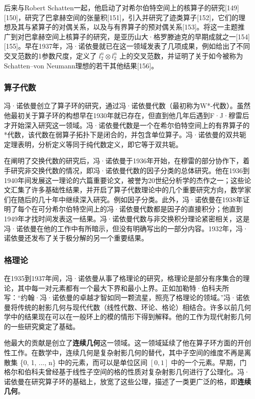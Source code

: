 后来与Robert Schatten一起，他启动了对希尔伯特空间上的核算子的研究[149][150]，研究了巴拿赫空间的张量积[151]，引入并研究了迹类算子[152]，它们的理想及其与紧算子的对偶关系，以及与有界算子的预对偶关系[153]。将这一主题推广到对巴拿赫空间上核算子的研究，是亚历山大·格罗滕迪克的早期成就之一[154][155]。早在1937年，冯·诺依曼就已在这一领域发表了几项成果，例如给出了不同交叉范数的1参数尺度，定义了 \({\textit {l}}_{2}^{n} \otimes {\textit {l}}_{2}^{n}\)  上的交叉范数，并证明了关于如今被称为Schatten–von Neumann理想的若干其他结果[156]。
\subsubsection{算子代数}
冯·诺依曼创立了算子环的研究，通过冯·诺依曼代数（最初称为W*-代数）。虽然他最初关于算子环的构想早在1930年就已存在，但直到他几年后遇到F·J·穆雷后才开始深入研究这一领域。冯·诺依曼代数是一个在希尔伯特空间上的有界算子的*代数，该代数在弱算子拓扑下是闭合的，并包含单位算子。冯·诺依曼的双共轭定理表明，分析定义等同于纯代数定义，即它等于双共轭。  

在阐明了交换代数的研究后，冯·诺依曼于1936年开始，在穆雷的部分协作下，着手研究非交换代数的情况，即冯·诺依曼代数的因子分类的总体研究。他在1936到1940年间发展这一理论的六篇重要论文，被誉为20世纪分析学的杰作之一；这些论文汇集了许多基础性结果，并开启了算子代数理论中的几个重要研究方向，数学家们在随后的几十年中继续深入研究。例如因子分类。此外，冯·诺依曼在1938年证明了每个在可分希尔伯特空间上的冯·诺依曼代数都是因子的直接积分；他直到1949年才找时间发表这一结果。冯·诺依曼代数与非交换积分理论紧密相关，这是冯·诺依曼在他的工作中有所暗示，但没有明确写出的一部分内容。1932年，冯·诺依曼还发布了关于极分解的另一个重要结果。
\subsubsection{格理论} 
在1935到1937年间，冯·诺依曼从事了格理论的研究，格理论是部分有序集合的理论，其中每一对元素都有一个最大下界和最小上界。正如加勒特·伯科夫所写：“约翰·冯·诺依曼的卓越才智如同一颗流星，照亮了格理论的领域。”冯·诺依曼将传统的射影几何与现代代数（线性代数、环论、格论）相结合。许多以前几何学中的结果现在可以在一般环上的模的情形下得到解释。他的工作为现代射影几何的一些研究奠定了基础。

他最大的贡献是创立了\textbf{连续几何}这一领域。这一领域延续了他在算子环方面的开创性工作。在数学中，连续几何是复杂射影几何的替代，其中子空间的维度不再是离散集 \{0, 1, ..., n\} 中的元素，而可以是单位区间 \([0, 1]\) 中的一个元素。早期，门格尔和伯科夫曾经基于线性子空间的格的性质对复杂射影几何进行了公理化。冯·诺依曼在研究算子环的基础上，放宽了这些公理，描述了一类更广泛的格，即\textbf{连续几何}。

